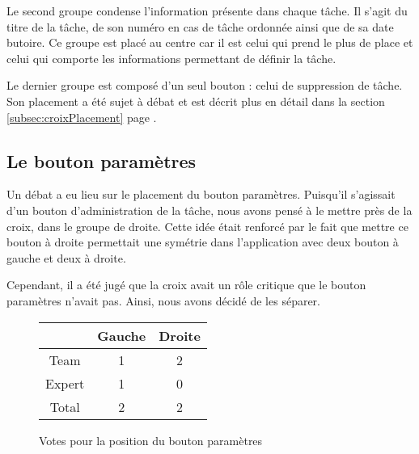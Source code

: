 \documentclass[11pt]{article}
\begin{document}
Le second groupe condense l'information présente dans chaque tâche. Il
s'agit du titre de la tâche, de son numéro en cas de tâche ordonnée
ainsi que de sa date butoire. Ce groupe est placé au centre car il est
celui qui prend le plus de place et celui qui comporte les
informations permettant de définir la tâche.

Le dernier groupe est composé d'un seul bouton : celui de suppression
de tâche. Son placement a été sujet à débat et est décrit plus en
détail dans la section \ref{subsec:croixPlacement} page \pageref{subsec:croixPlacement}.



\subsection{Le bouton paramètres}
\label{subsec:paramPlacement}

Un débat a eu lieu sur le placement du bouton paramètres. Puisqu'il
s'agissait d'un bouton d'administration de la tâche, nous avons pensé
à le mettre près de la croix, dans le groupe de droite. Cette idée
était renforcé par le fait que mettre ce bouton à droite permettait
une symétrie dans l'application avec deux bouton à gauche et deux à
droite.

Cependant, il a été jugé que la croix avait un rôle critique que le
bouton paramètres n'avait pas. Ainsi, nous avons décidé de les
séparer.

\begin{figure}[!h]
  \centering
  \begin{tabular}[!h]{cc|c}
    & Gauche & Droite\\
    \hline
    Team & 1 & 2\\
    Expert & 1 & 0\\
    \hline
    Total & 2 & 2\\
  \end{tabular}
  \caption{Votes pour la position du bouton paramètres}
  \label{fig:voteparam}
\end{figure}

\end{document}
